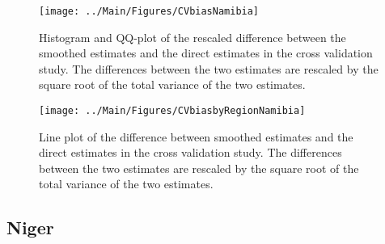\documentclass[12pt]{article}\usepackage[]{graphicx}\usepackage[]{color}
\newenvironment{knitrout}{}{} %
\begin{document}
\begin{knitrout}
\color{fgcolor}\begin{figure}[bht]

{\centering \texttt{[image: ../Main/Figures/CVbiasNamibia]} 

}

\caption[Histogram and QQ-plot of the rescaled difference between the smoothed estimates and the direct estimates in the cross validation study]{Histogram and QQ-plot of the rescaled difference between the smoothed estimates and the direct estimates in the cross validation study. The differences between the two estimates are rescaled by the square root of the total variance of the two estimates.}\label{fig:unnamed-chunk-249}
\end{figure}


\end{knitrout}

\begin{knitrout}
\color{fgcolor}\begin{figure}[bht]

{\centering \texttt{[image: ../Main/Figures/CVbiasbyRegionNamibia]} 

}

\caption[Line plot of the difference between smoothed estimates and the direct estimates in the cross validation study]{Line plot of the difference between smoothed estimates and the direct estimates in the cross validation study. The differences between the two estimates are rescaled by the square root of the total variance of the two estimates.}\label{fig:unnamed-chunk-250}
\end{figure}


\end{knitrout}


\clearpage
\subsection{Niger}


\end{document}
